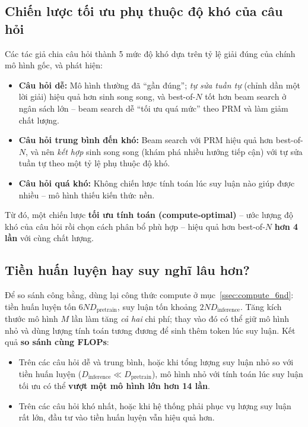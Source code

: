 \begin{center}
\label{fig:ttc_search}
\end{center}

\subsection{Chiến lược tối ưu phụ thuộc độ khó của câu hỏi}
\label{ssec:ttc_difficulty}
Các tác giả chia câu hỏi thành 5 mức độ khó dựa trên tỷ lệ giải đúng của chính mô hình gốc, và phát hiện:
\begin{itemize}
	\item \textbf{Câu hỏi dễ:} Mô hình thường đã “gần đúng”; \emph{tự sửa tuần tự} (chỉnh dần một lời giải) hiệu quả hơn sinh song song, và best-of-$N$ tốt hơn beam search ở ngân sách lớn -- beam search dễ “tối ưu quá mức” theo PRM và làm giảm chất lượng.
	\item \textbf{Câu hỏi trung bình đến khó:} Beam search với PRM hiệu quả hơn best-of-$N$, và nên \emph{kết hợp} sinh song song (khám phá nhiều hướng tiếp cận) với tự sửa tuần tự theo một tỷ lệ phụ thuộc độ khó.
	\item \textbf{Câu hỏi quá khó:} Không chiến lược tính toán lúc suy luận nào giúp được nhiều -- mô hình thiếu kiến thức nền.
\end{itemize}
Từ đó, một chiến lược \textbf{tối ưu tính toán (compute-optimal)} -- ước lượng độ khó của câu hỏi rồi chọn cách phân bổ phù hợp -- hiệu quả hơn best-of-$N$ \textbf{hơn 4 lần} với cùng chất lượng.

\subsection{Tiền huấn luyện hay suy nghĩ lâu hơn?}
\label{ssec:pretrain_vs_ttc}
Để so sánh công bằng, dùng lại công thức compute ở mục~\ref{ssec:compute_6nd}: tiền huấn luyện tốn $6ND_{\text{pretrain}}$, suy luận tốn khoảng $2ND_{\text{inference}}$. Tăng kích thước mô hình $M$ lần làm tăng \emph{cả hai} chi phí; thay vào đó có thể giữ mô hình nhỏ và dùng lượng tính toán tương đương để sinh thêm token lúc suy luận. Kết quả \textbf{so sánh cùng FLOPs}:
\begin{itemize}
	\item Trên các câu hỏi dễ và trung bình, hoặc khi tổng lượng suy luận nhỏ so với tiền huấn luyện ($D_{\text{inference}} \ll D_{\text{pretrain}}$), mô hình nhỏ với tính toán lúc suy luận tối ưu có thể \textbf{vượt một mô hình lớn hơn 14 lần}.
	\item Trên các câu hỏi khó nhất, hoặc khi hệ thống phải phục vụ lượng suy luận rất lớn, đầu tư vào tiền huấn luyện vẫn hiệu quả hơn.
\end{itemize}

